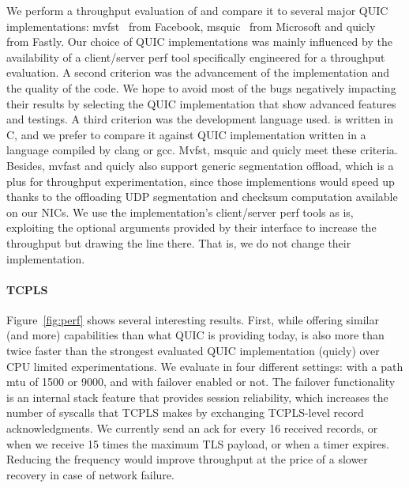 We perform a throughput evaluation of \tcpls and compare it to several major
QUIC implementations: mvfst~\cite{} from Facebook, msquic~\cite{} from Microsoft
and quicly~\cite{} from Fastly. Our choice of QUIC implementations was mainly
influenced by the availability of a client/server perf tool specifically
engineered for a throughput evaluation. A second criterion was the advancement
of the implementation and the quality of the code. We hope to avoid most of the
bugs negatively impacting their results by selecting the QUIC implementation
that show advanced features and testings. A third criterion was the development
language used. \tcpls is written in C, and we prefer to compare it against QUIC
implementation written in a language compiled by clang or gcc. Mvfst, msquic
and quicly meet these criteria. Besides, mvfast and quicly also support generic
segmentation offload, which is a plus for throughput experimentation, since those
implementions would speed up thanks to the offloading UDP segmentation and
checksum computation available on our NICs. We use the implementation's
client/server perf tools as is, exploiting the optional arguments provided
by their interface to increase the throughput but drawing the line there. That
is, we do not change their implementation.
\paragraph*{TCPLS}
Figure~\ref{fig:perf} shows several interesting results. First, while
offering similar (and more) capabilities than what QUIC is providing today,
\tcpls is also more than twice faster than the strongest evaluated QUIC
implementation (quicly) over CPU limited experimentations. We evaluate \tcpls
in four different settings: with a path mtu of 1500 or 9000, and with failover
enabled or not. The failover functionality is an internal stack feature that
provides session reliability, which increases the number of syscalls that TCPLS
makes by exchanging TCPLS-level record acknowledgments. We currently send an ack
for every 16 received records, or when we receive 15 times the maximum TLS
payload, or when a timer expires. Reducing the frequency would improve
throughput at the price of a slower recovery in case of network failure.
